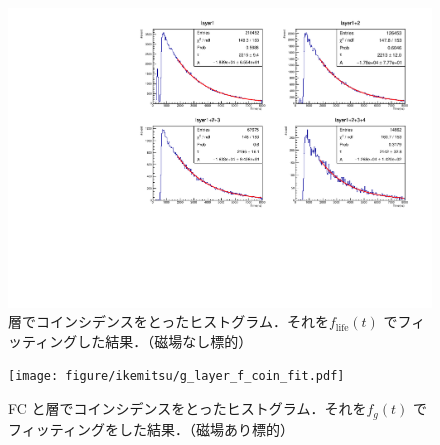 \begin{figure}[H]
\centering
\includegraphics[height = 0.9\columnwidth , angle = -90]{figure/ikemitsu/lt_layercoin_fit.pdf}
\caption{層でコインシデンスをとったヒストグラム．それを$f_{\mathrm{life}}(t)$ でフィッティングした結果．（磁場なし標的）}
\label{lt_layercoin_fit}
\end{figure}
  
\begin{figure}[H]
\centering
\texttt{[image: figure/ikemitsu/g\_layer\_f\_coin\_fit.pdf]}
\caption{FC と層でコインシデンスをとったヒストグラム．それを$f_{g}(t)$ でフィッティングをした結果．（磁場あり標的）}
\label{g_layercoin_fit}
\end{figure}

